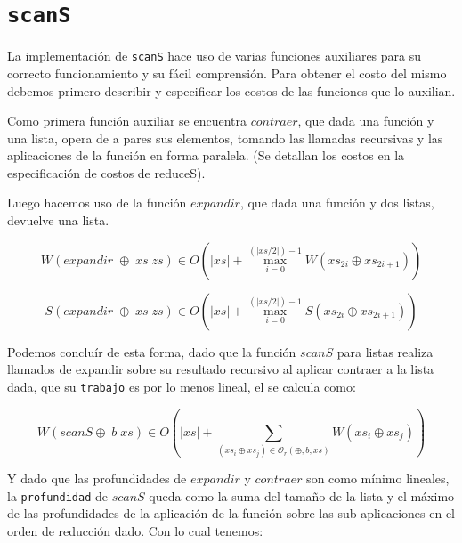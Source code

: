 \documentclass[a4paper,10pt]{article}
\begin{document}
\bigskip


\section*{\texttt{scanS}}

    La implementación de \texttt{scanS} hace uso de varias funciones auxiliares
para su correcto funcionamiento y su fácil comprensión. Para obtener el costo del
mismo debemos primero describir y especificar los costos de las funciones que lo 
auxilian.

    Como primera función auxiliar se encuentra $contraer$, que dada una función y
una lista, opera de a pares sus elementos, tomando las llamadas recursivas y las 
aplicaciones de la función en forma paralela. (Se detallan los costos en la
especificación de costos de reduceS).

\smallskip

    Luego hacemos uso de la función $expandir$, que dada una función y dos listas,
devuelve una lista. 

\begin{equation*}
    W \left( expandir \;\oplus \;xs \;zs \right) \in
    O \left( \vert xs \vert + \max_{i=0}^{(\vert xs / 2 \vert) - 1} W \left( xs_{2i} \oplus xs_{2i+1} \right) \right)
\end{equation*}

\begin{equation*}
    S \left( expandir \;\oplus \;xs \;zs \right) \in
    O \left( \vert xs \vert + \max_{i=0}^{(\vert xs / 2 \vert) - 1} S \left( xs_{2i} \oplus xs_{2i+1} \right) \right)
\end{equation*}

\bigskip

    Podemos concluír de esta forma, dado que la función $scanS$ para listas realiza
llamados de expandir sobre su resultado recursivo al aplicar contraer a la lista
dada, que su \texttt{trabajo} es por lo menos lineal, el se calcula como:

\begin{equation*}
    W \left( scanS \oplus \; b \; xs \right) \in
    O \left( \vert xs \vert + \sum_{(xs_i \oplus xs_j) \in \mathcal{O}_r(\oplus,b,xs)} W \left( xs_i \oplus xs_j \right) \right)
\end{equation*}

    Y dado que las profundidades de $expandir$ y $contraer$ son como mínimo lineales,
la \texttt{profundidad} de $scanS$ queda como la suma del tamaño de la lista y el
máximo de las profundidades de la aplicación de la función sobre las sub-aplicaciones
en el orden de reducción dado. Con lo cual tenemos:
\end{document}
